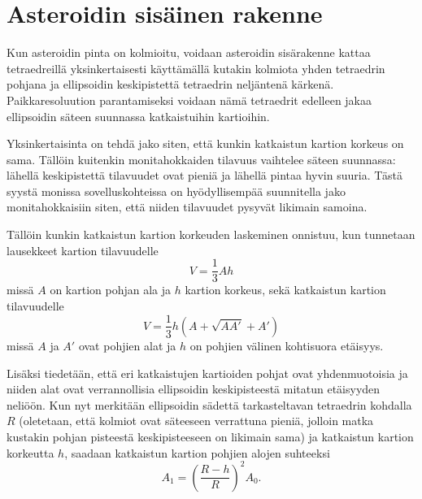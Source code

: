 \documentclass[12pt,a4paper,titlepage]{article}
\begin{document}
\section{Asteroidin sisäinen rakenne}
Kun asteroidin pinta on kolmioitu, voidaan asteroidin sisärakenne kattaa tetraedreillä yksinkertaisesti käyttämällä kutakin kolmiota yhden tetraedrin pohjana ja ellipsoidin keskipistettä tetraedrin neljäntenä kärkenä. Paikkaresoluution parantamiseksi voidaan nämä tetraedrit edelleen jakaa ellipsoidin säteen suunnassa katkaistuihin kartioihin.

Yksinkertaisinta on tehdä jako siten, että kunkin katkaistun kartion korkeus on sama. Tällöin kuitenkin monitahokkaiden tilavuus vaihtelee säteen suunnassa: lähellä keskipistettä tilavuudet ovat pieniä ja lähellä pintaa hyvin suuria. Tästä syystä monissa sovelluskohteissa on hyödyllisempää suunnitella jako monitahokkaisiin siten, että niiden tilavuudet pysyvät likimain samoina.

Tällöin kunkin katkaistun kartion korkeuden laskeminen onnistuu, kun tunnetaan lausekkeet kartion tilavuudelle
\begin{equation}
	V=\frac{1}{3}Ah
\end{equation}
missä $A$ on kartion pohjan ala ja $h$ kartion korkeus, sekä katkaistun kartion tilavuudelle
\begin{equation}\label{katkaistukartio}
	 V = \frac{1}{3} h (A + \sqrt {AA'} + A')
\end{equation}
missä $A$ ja $A'$ ovat pohjien alat ja $h$ on pohjien välinen kohtisuora etäisyys. \cite{wiki:kartio}

Lisäksi tiedetään, että eri katkaistujen kartioiden pohjat ovat yhdenmuotoisia ja niiden alat ovat verrannollisia ellipsoidin keskipisteestä mitatun etäisyyden neliöön. Kun nyt merkitään ellipsoidin sädettä tarkasteltavan tetraedrin kohdalla $R$ (oletetaan, että kolmiot ovat säteeseen verrattuna pieniä, jolloin matka kustakin pohjan pisteestä keskipisteeseen on likimain sama) ja katkaistun kartion korkeutta $h$, saadaan katkaistun kartion pohjien alojen suhteeksi
\begin{equation*}
	A_1=\left(\frac{R-h}{R}\right)^2A_0.
\end{equation*}
\end{document}
